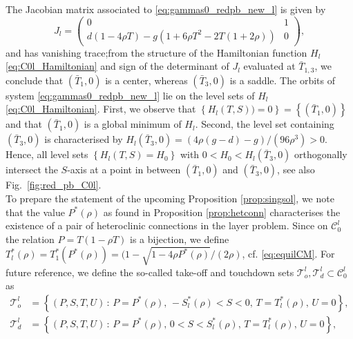 \documentclass[a4paper,10pt,abstract=true,parskip=true]{scrartcl}
\theoremstyle{remark}
\numberwithin{equation}{section}
\numberwithin{thm}{section}
\begin{document}
The Jacobian matrix associated to \eqref{eq:gammas0_redpb_new_l} is given by
\[
J_l = \begin{pmatrix}
    0 & 1 \\
    d(1-4\rho T)-g\left(1+6\rho T^2-2T(1+2\rho)\right) & 0
\end{pmatrix},
\]
and has vanishing trace;from the structure of the Hamiltonian function $H_l$ \eqref{eq:C0l_Hamiltonian} and sign of the determinant of $J_l$ evaluated at $\bar{T}_{1,3}$, we conclude that $(\bar{T}_1,0)$ is a center, whereas $(\bar{T}_3,0)$ is a saddle. 
The orbits of system \eqref{eq:gammas0_redpb_new_l} lie on the level sets of $H_l$ \eqref{eq:C0l_Hamiltonian}. First, we observe that $\left\{H_l(T,S)) = 0 \right\} = \left\{(\bar{T}_1,0)\right\}$ and that $(\bar{T}_1,0)$ is a global minimum of $H_l$. Second, the level set containing $(\bar{T}_3,0)$ is characterised by $H_l(\bar{T}_3,0) = (4 \rho(g-d)-g)/(96 \rho^3) > 0$. Hence, all level sets $\left\{H_l(T,S) = H_0\right\}$ with $0 < H_0 < H_l(\bar{T}_3,0)$ orthogonally intersect the $S$-axis at a point in between $(\bar{T}_1,0)$ and $(\bar{T}_3,0)$, see also Fig.~\ref{fig:red_pb_C0l}.\\
To prepare the statement of the upcoming Proposition \ref{prop:singsol}, we note that the value $P^\ast(\rho)$ as found in Proposition \ref{prop:hetconn} characterises the existence of a pair of heteroclinic connections in the layer problem. Since on $\mathcal{C}_0^l$ the relation $P = T(1-\rho T)$ is a bijection, we define $T^\ast_l(\rho) = T^\ast_1(P^\ast(\rho)) = (1-\sqrt{1-4 \rho P^\ast(\rho)}/(2 \rho)$, cf. \eqref{eq:equilCM}. For future reference, we define the so-called take-off and touchdown sets $\mathcal{T}_o^l, \mathcal{T}_d^l \subset \mathcal{C}_0^l$ as
\begin{equation} \label{eq:totdl}
\begin{aligned}
    \mathcal{T}_o^l &= \left\{ (P, S, T, U) \, : \, P=P^\ast(\rho), \, - S^\ast_l(\rho) < S < 0,\, T=T_l^\ast(\rho), \, U = 0  \right\}, \\
    \mathcal{T}_d^l &= \left\{ (P, S, T, U) \, : \, P=P^\ast(\rho), \, 0 < S < S^\ast_l(\rho),\, T=T_l^\ast(\rho), \, U = 0 \right\},
\end{aligned}
\end{equation}
\end{document}
